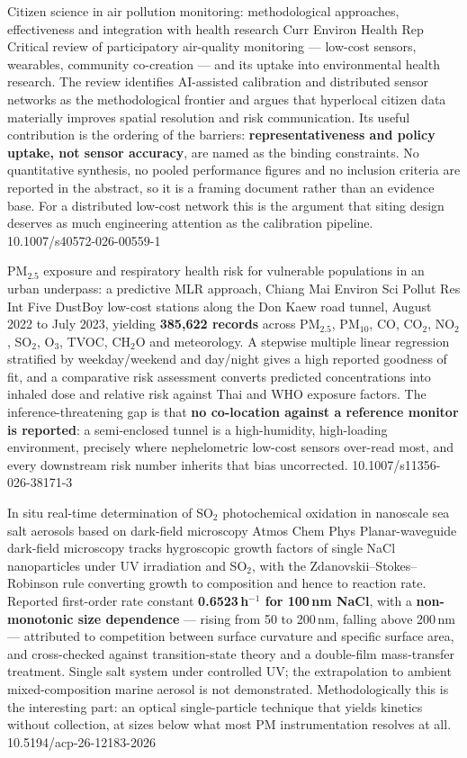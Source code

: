 \documentclass[10pt]{article}
\begin{document}
{Citizen science in air pollution monitoring: methodological approaches, effectiveness
and integration with health research}
{Curr Environ Health Rep}
{Critical review of participatory air-quality monitoring --- low-cost sensors, wearables,
community co-creation --- and its uptake into environmental health research. The review
identifies AI-assisted calibration and distributed sensor networks as the methodological
frontier and argues that hyperlocal citizen data materially improves spatial resolution
and risk communication. Its useful contribution is the ordering of the barriers:
\textbf{representativeness and policy uptake, not sensor accuracy}, are named as the
binding constraints. No quantitative synthesis, no pooled performance figures and no
inclusion criteria are reported in the abstract, so it is a framing document rather than
an evidence base. For a distributed low-cost network this is the argument that siting
design deserves as much engineering attention as the calibration pipeline.}
{10.1007/s40572-026-00559-1}

{PM$_{2.5}$ exposure and respiratory health risk for vulnerable populations in an urban
underpass: a predictive MLR approach, Chiang Mai}
{Environ Sci Pollut Res Int}
{Five DustBoy low-cost stations along the Don Kaew road tunnel, August 2022 to July 2023,
yielding \textbf{385{,}622 records} across PM$_{2.5}$, PM$_{10}$, CO, CO$_2$, NO$_2$,
SO$_2$, O$_3$, TVOC, CH$_2$O and meteorology. A stepwise multiple linear regression
stratified by weekday/weekend and day/night gives a high reported goodness of fit, and a
comparative risk assessment converts predicted concentrations into inhaled dose and
relative risk against Thai and WHO exposure factors. The inference-threatening gap is
that \textbf{no co-location against a reference monitor is reported}: a semi-enclosed
tunnel is a high-humidity, high-loading environment, precisely where nephelometric
low-cost sensors over-read most, and every downstream risk number inherits that bias
uncorrected.}
{10.1007/s11356-026-38171-3}

{In situ real-time determination of SO$_2$ photochemical oxidation in nanoscale sea salt
aerosols based on dark-field microscopy}
{Atmos Chem Phys}
{Planar-waveguide dark-field microscopy tracks hygroscopic growth factors of single NaCl
nanoparticles under UV irradiation and SO$_2$, with the Zdanovskii--Stokes--Robinson rule
converting growth to composition and hence to reaction rate. Reported first-order rate
constant \textbf{0.6523\,h$^{-1}$ for 100\,nm NaCl}, with a \textbf{non-monotonic size
dependence} --- rising from 50 to 200\,nm, falling above 200\,nm --- attributed to
competition between surface curvature and specific surface area, and cross-checked
against transition-state theory and a double-film mass-transfer treatment. Single
salt system under controlled UV; the extrapolation to ambient mixed-composition marine
aerosol is not demonstrated. Methodologically this is the interesting part: an optical
single-particle technique that yields kinetics without collection, at sizes below what
most PM instrumentation resolves at all.}
{10.5194/acp-26-12183-2026}
\end{document}
